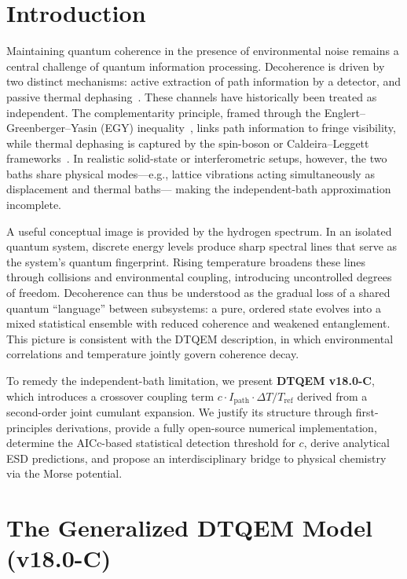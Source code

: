 \documentclass[reprint,amsmath,amssymb,aps,pra,superscriptaddress]{revtex4-2}
\begin{document}
\section{Introduction}
Maintaining quantum coherence in the presence of environmental noise remains
a central challenge of quantum information processing. Decoherence is driven
by two distinct mechanisms: active extraction of path information by a
detector, and passive thermal dephasing~\cite{breuer2002}. These channels
have historically been treated as independent. The complementarity principle,
framed through the Englert--Greenberger--Yasin (EGY)
inequality~\cite{englert1996}, links path information to fringe visibility,
while thermal dephasing is captured by the spin-boson or Caldeira--Leggett
frameworks~\cite{weiss2012}. In realistic solid-state or
interferometric setups, however, the two baths share physical modes---e.g.,
lattice vibrations acting simultaneously as displacement and thermal baths---
making the independent-bath approximation incomplete.

A useful conceptual image is provided by the hydrogen spectrum. In an isolated
quantum system, discrete energy levels produce sharp spectral lines that serve
as the system's quantum fingerprint. Rising temperature broadens these lines
through collisions and environmental coupling, introducing uncontrolled degrees
of freedom. Decoherence can thus be understood as the gradual loss of a shared
quantum ``language'' between subsystems: a pure, ordered state evolves into a
mixed statistical ensemble with reduced coherence and weakened entanglement.
This picture is consistent with the DTQEM description, in which environmental
correlations and temperature jointly govern coherence decay.

To remedy the independent-bath limitation, we present
\textbf{DTQEM v18.0-C}, which introduces a crossover coupling term
$c\cdot I_{\text{path}}\cdot\Delta T/T_{\text{ref}}$ derived from a
second-order joint cumulant expansion. We justify its structure through
first-principles derivations, provide a fully open-source numerical
implementation, determine the AICc-based statistical detection threshold
for $c$, derive analytical ESD predictions, and propose an
interdisciplinary bridge to physical chemistry via the Morse potential.

\section{The Generalized DTQEM Model (v18.0-C)}
\end{document}
